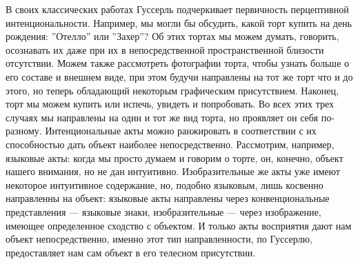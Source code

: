 \documentclass[11pt]{book}
\begin{document}
В своих классических работах Гуссерль подчеркивает первичность перцептивной интенциональности. Например, мы могли бы обсудить, какой торт купить на день рождения: ''Отелло'' или ''Захер''? Об этих тортах мы можем думать, говорить, осознавать их даже при их в непосредственной пространственной близости отсутствии. Можем также рассмотреть фотографии торта, чтобы узнать больше о его составе и внешнем виде, при этом будучи направлены на тот же торт что и до этого, но теперь обладающий некоторым графическим присутствием. Наконец, торт мы можем купить или испечь, увидеть и попробовать. Во всех этих трех случаях мы направлены на один и тот же вид торта, но проявляет он себя по-разному. Интенциональные акты можно ранжировать в соответствии с их способностью дать объект наиболее непосредственно. Рассмотрим, например, языковые акты: когда мы просто думаем и говорим о торте, он, конечно, объект нашего внимания, но не дан интуитивно. Изобразительные же акты уже имеют некоторое интуитивное содержание, но, подобно языковым, лишь косвенно направленны на объект: языковые акты направлены через конвенциональные представления --- языковые знаки, изобразительные --- через изображение, имеющее определенное сходство с объектом. И только акты восприятия дают нам объект непосредственно, именно этот тип направленности, по Гуссерлю, предоставляет нам сам объект в его телесном присутствии.
\end{document}
